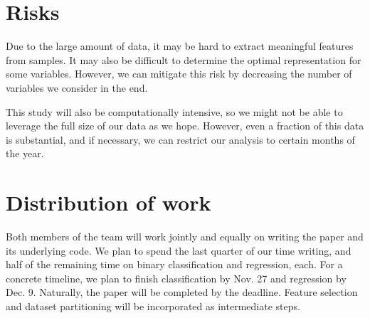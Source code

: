 \documentclass{article}
\begin{document}
\section{Risks}
Due to the large amount of data, it may be hard to extract
meaningful features from samples.
It may also be difficult to determine the optimal representation
for some variables.
However, we can mitigate this risk by decreasing
the number of variables we consider in the end.

This study will also be computationally intensive,
so we might not be able to leverage the full size
of our data as we hope.
However, even a fraction of this data is substantial,
and if necessary, we can restrict our analysis to
certain months of the year.

\section{Distribution of work}
Both members of the team will work jointly and equally on writing the paper
and its underlying code.
We plan to spend the last quarter of our time writing,
and half of the remaining time on binary classification and regression, each.
For a concrete timeline, we plan to finish classification by Nov. 27
and regression by Dec. 9.
Naturally, the paper will be completed by the deadline.
Feature selection and dataset partitioning
will be incorporated as intermediate steps.

\end{document}
